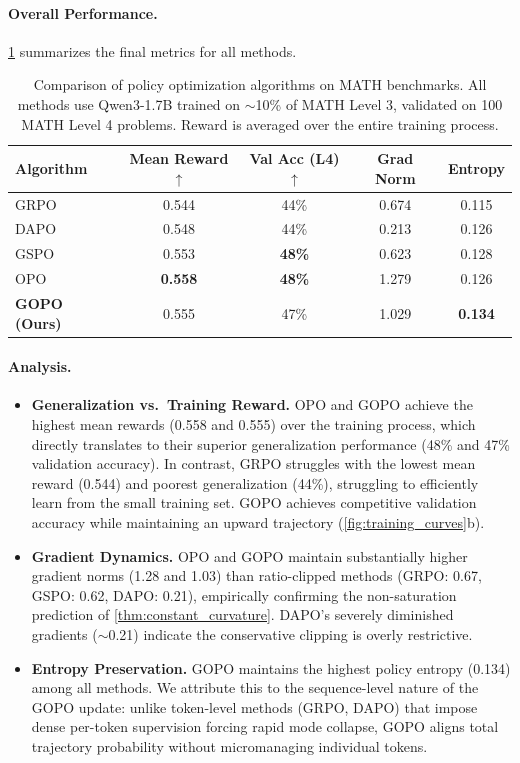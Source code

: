 \documentclass[11pt]{article}
\theoremstyle{definition}
\theoremstyle{remark}
\begin{document}
\paragraph{Overall Performance.} \cref{tab:results} summarizes the final metrics for all methods.

\begin{table}[htbp]
\centering
\caption{Comparison of policy optimization algorithms on MATH benchmarks. All methods use Qwen3-1.7B trained on $\sim$10\% of MATH Level 3, validated on 100 MATH Level 4 problems. Reward is averaged over the entire training process.}
\label{tab:results}
\begin{tabular}{lcccc}
\toprule
\textbf{Algorithm} & \textbf{Mean Reward}$\uparrow$ & \textbf{Val Acc (L4)}$\uparrow$ & \textbf{Grad Norm} & \textbf{Entropy} \\
\midrule
GRPO & 0.544 & 44\% & 0.674 & 0.115 \\
DAPO & 0.548 & 44\% & 0.213 & 0.126 \\
GSPO & 0.553 & \textbf{48\%} & 0.623 & 0.128 \\
OPO  & \textbf{0.558} & \textbf{48\%} & 1.279 & 0.126 \\
\textbf{GOPO (Ours)} & 0.555 & 47\% & 1.029 & \textbf{0.134} \\
\bottomrule
\end{tabular}
\end{table}

\paragraph{Analysis.}
\begin{itemize}[leftmargin=2em]
    \item \textbf{Generalization vs.\ Training Reward.} OPO and GOPO achieve the highest mean rewards (0.558 and 0.555) over the training process, which directly translates to their superior generalization performance (48\% and 47\% validation accuracy). In contrast, GRPO struggles with the lowest mean reward (0.544) and poorest generalization (44\%), struggling to efficiently learn from the small training set. GOPO achieves competitive validation accuracy while maintaining an upward trajectory (\cref{fig:training_curves}b).
    \item \textbf{Gradient Dynamics.} OPO and GOPO maintain substantially higher gradient norms (1.28 and 1.03) than ratio-clipped methods (GRPO: 0.67, GSPO: 0.62, DAPO: 0.21), empirically confirming the non-saturation prediction of \cref{thm:constant_curvature}. DAPO's severely diminished gradients ($\sim$0.21) indicate the conservative clipping is overly restrictive.
    \item \textbf{Entropy Preservation.} GOPO maintains the highest policy entropy (0.134) among all methods. We attribute this to the sequence-level nature of the GOPO update: unlike token-level methods (GRPO, DAPO) that impose dense per-token supervision forcing rapid mode collapse, GOPO aligns total trajectory probability without micromanaging individual tokens.
\end{itemize}
\end{document}
